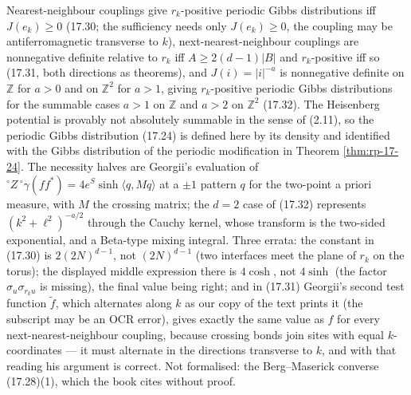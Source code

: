 \begin{example}[Georgii (17.30)--(17.32)]
    Nearest-neighbour couplings give $r_k$-positive periodic Gibbs distributions iff $J(e_k) \geq 0$
    (17.30; the sufficiency needs only $J(e_k) \geq 0$, the coupling may be antiferromagnetic
    transverse to $k$), next-nearest-neighbour couplings are nonnegative definite relative to $r_k$
    iff $A \geq 2(d-1)|B|$ and $r_k$-positive iff so (17.31, both directions as theorems), and
    $J(i) = |i|^{-a}$ is nonnegative definite on $\mathbb Z$ for $a > 0$ and on $\mathbb Z^2$ for
    $a > 1$, giving $r_k$-positive periodic Gibbs distributions for the summable cases $a > 1$ on
    $\mathbb Z$ and $a > 2$ on $\mathbb Z^2$ (17.32). The Heisenberg potential is provably not
    absolutely summable in the sense of (2.11), so the periodic Gibbs distribution (17.24) is
    defined here by its density and identified with the Gibbs distribution of the periodic
    modification in Theorem \ref{thm:rp-17-24}. The necessity halves are Georgii's evaluation of ${}^\circ Z\,{}^\circ\gamma(ff^*) =
    4e^{S}\sinh\langle q, Mq\rangle$ at a $\pm 1$ pattern $q$ for the two-point a priori measure,
    with $M$ the crossing matrix; the $d = 2$ case of (17.32) represents $(k^2 + \ell^2)^{-a/2}$
    through the Cauchy kernel, whose transform is the two-sided exponential, and a Beta-type
    mixing integral. Three errata: the constant in (17.30) is $2(2N)^{d-1}$, not $(2N)^{d-1}$
    (two interfaces meet the plane of $r_k$ on the torus); the displayed middle expression there
    is $4\cosh$, not $4\sinh$ (the factor $\sigma_u\sigma_{r_k u}$ is missing), the final value
    being right; and in (17.31) Georgii's second test function $\tilde f$, which alternates along
    $k$ as our copy of the text prints it (the subscript may be an OCR error), gives exactly the
    same value as $f$ for every next-nearest-neighbour coupling, because
    crossing bonds join sites with equal $k$-coordinates --- it must alternate in the directions
    transverse to $k$, and with that reading his argument is correct. Not formalised: the
    Berg--Maserick converse (17.28)(1), which the book cites without proof.
\end{example}
